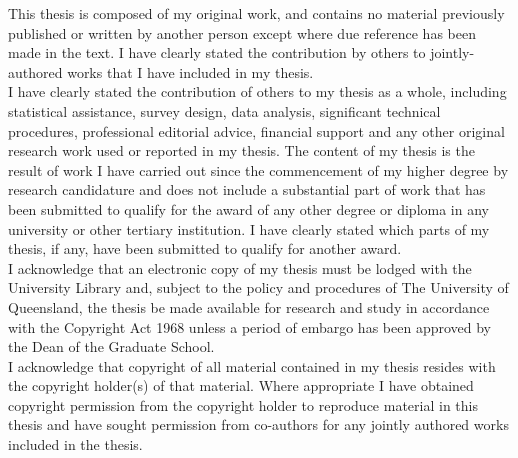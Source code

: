 \noindent
This thesis is composed of my original work, and contains no material previously published or written by another person except where due reference has been made in the text. I have clearly stated the contribution by others to jointly-authored works that I have included in my thesis.\\

\noindent
I have clearly stated the contribution of others to my thesis as a whole, including statistical assistance, survey design, data analysis, significant technical procedures, professional editorial advice, financial support and any other original research work used or reported in my thesis. The content of my thesis is the result of work I have carried out since the commencement of my higher degree by research candidature and does not include a substantial part of work that has been submitted to qualify for the award of any other degree or diploma in any university or other tertiary institution. I have clearly stated which parts of my thesis, if any, have been submitted to qualify for another award.\\

\noindent
I acknowledge that an electronic copy of my thesis must be lodged with the University Library and, subject to the policy and procedures of The University of Queensland, the thesis be made available for research and study in accordance with the Copyright Act 1968 unless a period of embargo has been approved by the Dean of the Graduate School. \\

\noindent
I acknowledge that copyright of all material contained in my thesis resides with the copyright holder(s) of that material. Where appropriate I have obtained copyright permission from the copyright holder to reproduce material in this thesis and have sought permission from co-authors for any jointly authored works included in the thesis.